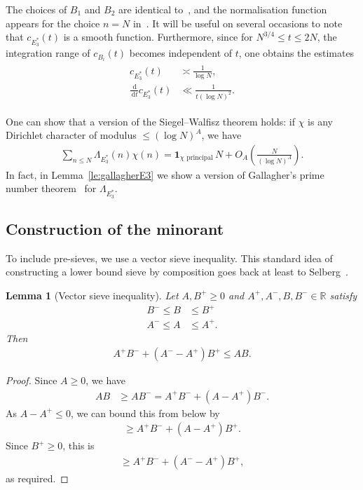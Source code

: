 \documentclass[12pt]{amsart}
\newtheorem{lemma}[theorem]{Lemma}
\theoremstyle{definition}
\theoremstyle{remark}
\numberwithin{equation}{section}
\newcommand{\1}{\mathbf{1}}
\newcommand{\R}{{\mathbb R}}
\renewcommand\d{\,\mathrm{d}}
\begin{document}
The choices of $B_1$ and $B_2$ are identical to~\cite[equations (6.2a), (6.2b)]{matomaki-shao}, and the normalisation function appears for the choice $n=N$ in~\cite[equation (6.3)]{matomaki-shao}. It will be useful on several occasions to note that $c_{E_3^*}(t)$ is a smooth function. Furthermore, since for $N^{3/4}\leq t \leq 2N$, the integration range of $c_{B_i}(t)$ becomes independent of $t$, one obtains the estimates
\begin{align}
\label{eq:c_E}
   \begin{aligned} c_{E_3^*}(t)&\asymp \frac{1}{\log N},\\
    \frac{\d}{\d t}c_{E_3^*}(t)&\ll \frac{1}{t (\log N)^2}.
    \end{aligned}
\end{align}

One can show that a version of the Siegel--Walfisz theorem holds: if $\chi$ is any Dirichlet character of modulus $\leq (\log N)^{A}$, we have
\begin{align*}
 \sum_{n\leq N}\Lambda_{E_3^{*}}(n)\chi(n)=\1_{\chi \text{ principal}}\,N+O_A\left(\frac{N}{(\log N)^{A}}\right). 
\end{align*}
In fact, in Lemma~\ref{le:gallagherE3} we show a version of Gallagher's prime number theorem~\cite[Theorem 7]{Gal} for $\Lambda_{E_3^*}$.



 \subsection{Construction of the minorant}

 To include pre-sieves, we use a vector sieve inequality. This standard idea of constructing a lower bound sieve by composition goes back at least to Selberg~\cite{selberg}. 

	\begin{lemma}[Vector sieve inequality]\label{lem_lowerboundsievcomp}
		Let $A,B^+\geq 0$ and $A^{+},A^{-},B, B^- \in \R$ satisfy
		\begin{align*}
			B^-\leq B &\leq B^+ \\
			A^-\leq A &\leq A^+.
		\end{align*}
		Then
		\begin{align*}
			A^+B^- +(A^- -A^+)B^+  \leq AB.
		\end{align*}
	\end{lemma}
\begin{proof}
Since $A\geq 0$, we have
\begin{align*}
AB&\geq AB^-=A^+B^- +(A-A^+)B^-.
\end{align*}
As $A-A^+\leq 0$, we can bound this from below by
\begin{align*}
\geq A^+B^- +(A-A^+)B^+.
\end{align*}
Since $B^+\geq 0$, this is
\begin{align*}
\geq A^+B^- +(A^- -A^+)B^+, 
\end{align*}
as required.
\end{proof}
\end{document}
